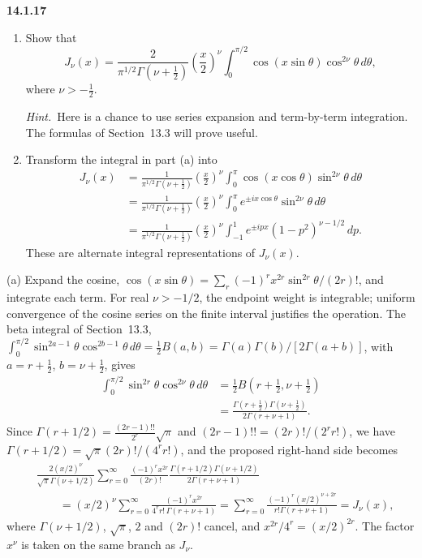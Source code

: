 \par\bigskip
\noindent\textbf{14.1.17}
\begin{enumerate}
\item[(a)] Show that
\[
J_{\nu}(x)=\frac{2}{\pi^{1/2}\Gamma(\nu+\frac{1}{2})}
\left(\frac{x}{2}\right)^{\nu}
\int_{0}^{\pi/2}\cos(x\sin\theta)\cos^{2\nu}\theta\,d\theta,
\]
where $\nu>-\frac{1}{2}$.
\par\emph{Hint.}~Here is a chance to use series expansion and
term-by-term integration. The formulas of Section~13.3 will prove
useful.
\item[(b)] Transform the integral in part (a) into
\begin{align*}
J_{\nu}(x)&=\frac{1}{\pi^{1/2}\Gamma(\nu+\frac{1}{2})}
\left(\frac{x}{2}\right)^{\nu}
\int_{0}^{\pi}\cos(x\cos\theta)\sin^{2\nu}\theta\,d\theta\\[2pt]
&=\frac{1}{\pi^{1/2}\Gamma(\nu+\frac{1}{2})}
\left(\frac{x}{2}\right)^{\nu}
\int_{0}^{\pi}e^{\pm ix\cos\theta}\sin^{2\nu}\theta\,d\theta\\[2pt]
&=\frac{1}{\pi^{1/2}\Gamma(\nu+\frac{1}{2})}
\left(\frac{x}{2}\right)^{\nu}
\int_{-1}^{1}e^{\pm ipx}(1-p^{2})^{\nu-1/2}\,dp.
\end{align*}
These are alternate integral representations of $J_{\nu}(x)$.
\end{enumerate}
\solution
(a) Expand the cosine,
$\cos(x\sin\theta)=\sum_r(-1)^rx^{2r}\sin^{2r}\theta/(2r)!$, and
integrate each term. For real $\nu>-1/2$, the endpoint weight is
integrable; uniform convergence of the cosine series on the finite
interval justifies the operation. The beta integral of Section~13.3,
$\int_0^{\pi/2}\sin^{2a-1}\theta\cos^{2b-1}\theta\,d\theta=\frac12B(a,b)
=\Gamma(a)\Gamma(b)/[2\Gamma(a+b)]$, with $a=r+\frac12$,
$b=\nu+\frac12$, gives
\begin{align*}
\int_0^{\pi/2}\sin^{2r}\theta\cos^{2\nu}\theta\,d\theta
&=\frac12B(r+\tfrac12,\nu+\tfrac12)\\
&=\frac{\Gamma(r+\tfrac12)\Gamma(\nu+\tfrac12)}
 {2\Gamma(r+\nu+1)}.
\end{align*}
Since $\Gamma(r+1/2)=\frac{(2r-1)!!}{2^r}\sqrt\pi$ and
$(2r-1)!!=(2r)!/(2^rr!)$, we have $\Gamma(r+1/2)=\sqrt\pi(2r)!/(4^r r!)$,
and the proposed right-hand side becomes
\begin{align*}
&\frac{2(x/2)^\nu}{\sqrt\pi\Gamma(\nu+1/2)}
\sum_{r=0}^\infty\frac{(-1)^rx^{2r}}{(2r)!}
 \frac{\Gamma(r+1/2)\Gamma(\nu+1/2)}{2\Gamma(r+\nu+1)}\\
&\qquad=(x/2)^\nu\sum_{r=0}^\infty
 \frac{(-1)^rx^{2r}}{4^rr!\,\Gamma(r+\nu+1)}
=\sum_{r=0}^\infty
 \frac{(-1)^r(x/2)^{\nu+2r}}{r!\Gamma(r+\nu+1)}
=J_\nu(x),
\end{align*}
where $\Gamma(\nu+1/2)$, $\sqrt\pi$, $2$ and $(2r)!$ cancel, and
$x^{2r}/4^r=(x/2)^{2r}$.
The factor $x^\nu$ is taken on the same branch as $J_\nu$.

